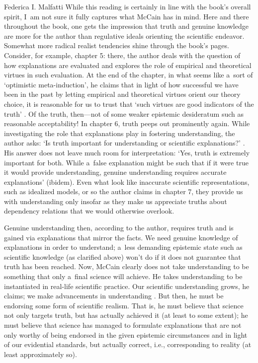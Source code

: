 \begin{recengenv}{Federica I. Malfatti}
\enlargethispage{1.5\baselineskip}
While this reading is certainly in line with the book's overall spirit, I~am not sure it fully captures what McCain has in mind. Here and there throughout the book, one gets the impression that truth and genuine knowledge are more for the author than regulative ideals orienting the scientific endeavor. Somewhat more radical realist tendencies shine through the book's pages. Consider, for example, chapter 5: there, the author deals with the question of how explanations are evaluated and explores the role of empirical and theoretical virtues in such evaluation. At the end of the chapter, in what seems like a~sort of ‘optimistic meta-induction', he claims that in light of how successful we have been in the past by letting empirical and theoretical virtues orient our theory choice, it is reasonable for us to trust that ‘such virtues are good indicators of the truth'
\parencite[][p.68]{mccain_understanding_2022}. %
 Of the truth, then---not of some weaker epistemic desideratum such as reasonable acceptability! In chapter 6, truth peeps out prominently again. While investigating the role that explanations play in fostering understanding, the author asks: ‘Is truth important for understanding or scientific explanations?' 
\parencite[][p.78]{mccain_understanding_2022}. %
 His answer does not leave much room for interpretation: ‘Yes, truth is extremely important for both. While a~false explanation might be such that if it were true it would provide understanding, genuine understanding requires accurate explanations' (ibidem). Even what look like inaccurate scientific representations, such as idealized models, or so the author claims in chapter 7, they provide us with understanding only insofar as they make us appreciate truths about dependency relations that we would otherwise overlook.

Genuine understanding then, according to the author, requires truth and is gained via explanations that mirror the facts. We need genuine knowledge of explanations in order to understand; a~less demanding epistemic state such as scientific knowledge (as clarified above) won't do if it does not guarantee that truth has been reached. Now, McCain clearly does not take understanding to be something that only a~final science will achieve. He takes understanding to be instantiated in real-life scientific practice. Our scientific understanding grows, he claims; we make advancements in understanding
\parencite[see, e.g.][p.68]{mccain_understanding_2022}. %
 But then, he must be endorsing some form of scientific realism. That is, he must believe that science not only targets truth, but has actually achieved it (at least to some extent); he must believe that science has managed to formulate explanations that are not only worthy of being endorsed in the given epistemic circumstances and in light of our evidential standards, but actually correct, i.e., corresponding to reality (at least approximately so).


\end{recengenv}
